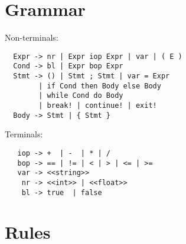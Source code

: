 \documentclass[11pt]{report}
\begin{document}
\thispagestyle{empty}
\section*{Grammar}

Non-terminals:
  \begin{lstlisting}
  Expr -> nr | Expr iop Expr | var | ( E )
  Cond -> bl | Expr bop Expr 
  Stmt -> () | Stmt ; Stmt | var = Expr
        | if Cond then Body else Body
        | while Cond do Body
        | break! | continue! | exit!
  Body -> Stmt | { Stmt }
  \end{lstlisting}

\vspace{3em}
\noindent Terminals:
    \begin{lstlisting}
   iop -> +  | -  | * | / 
   bop -> == | != | < | > | <= | >=
   var -> <<string>>
    nr -> <<int>> | <<float>>
    bl -> true  | false
  \end{lstlisting}





\newpage
\thispagestyle{empty} %
\section*{Rules}
\end{document}
